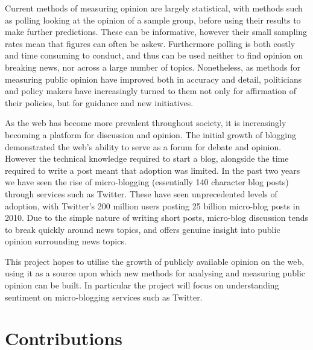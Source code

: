 Current methods of measuring opinion are largely statistical, with methods such as polling looking at the opinion of a sample group, before using their results to make further predictions. These can be informative, however their small sampling rates mean that figures can often be askew. Furthermore polling is both costly and time consuming to conduct, and thus can be used neither to find opinion on breaking news, nor across a large number of topics. Nonetheless, as methods for measuring public opinion have improved both in accuracy and detail, politicians and policy makers have increasingly turned to them not only for affirmation of their policies, but for guidance and new initiatives.

As the web has become more prevalent throughout society, it is increasingly becoming a platform for discussion and opinion. The initial growth of blogging demonstrated the web's ability to serve as a forum for debate and opinion. However the technical knowledge required to start a blog, alongside the time required to write a post meant that adoption was limited. In the past two years we have seen the rise of micro-blogging (essentially 140 character blog posts) through services such as Twitter. These have seen unprecedented levels of adoption, with Twitter's 200 million users posting 25 billion micro-blog posts in 2010. Due to the simple nature of writing short posts, micro-blog discussion tends to break quickly around news topics, and offers genuine insight into public opinion surrounding news topics.

This project hopes to utilise the growth of publicly available opinion on the web, using it as a source upon which new methods for analysing and measuring public opinion can be built. In particular the project will focus on understanding sentiment on micro-blogging services such as Twitter. 

\section{Contributions}

